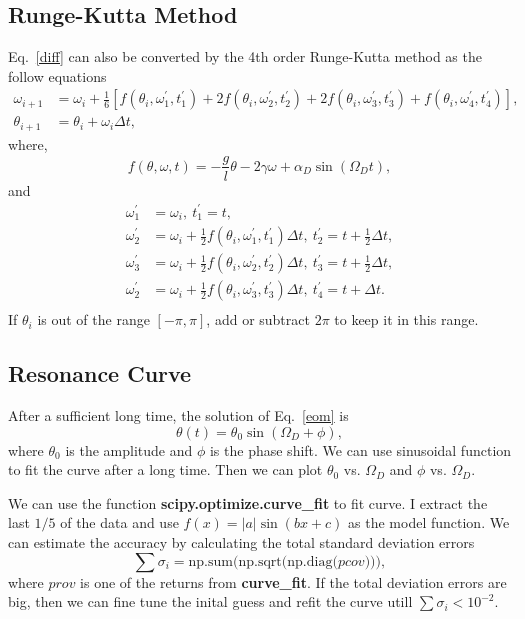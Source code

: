 \documentclass[a4paper]{article}
\begin{document}
	\subsection{Runge-Kutta Method}
	Eq.~\eqref{diff} can also be converted by the 4th order Runge-Kutta method as the follow equations
	\begin{align}
		\omega _{i+1} &= \omega _i + \frac{1}{6}[f(\theta _i, \omega _1^{\prime}, t_1^{\prime}) + 2f(\theta _i, \omega _2^{\prime}, t_2^{\prime}) + 2f(\theta _i, \omega _3^{\prime}, t_3^{\prime}) + f(\theta _i, \omega _4^{\prime}, t_4^{\prime})], \\
		\theta _{i+1} &= \theta _i + \omega _i \Delta t, \nonumber
	\end{align}
	where,
	\begin{equation*}
		f(\theta, \omega, t) = -\frac{g}{l}\theta - 2\gamma\omega + \alpha _D\sin(\Omega _D t),	
	\end{equation*}
	and
	\begin{align*}
		\omega _1^{\prime} &= \omega _i, \mathrm{~}t _1^{\prime} = t,\\
		\omega _2^{\prime} &= \omega _i + \frac{1}{2}f(\theta _i, \omega _1^{\prime}, t_1^{\prime})\Delta t , \mathrm{~}t _2^{\prime} = t + \frac{1}{2}\Delta t,\\
		\omega _3^{\prime} &= \omega _i + \frac{1}{2}f(\theta _i, \omega _2^{\prime}, t_2^{\prime})\Delta t , \mathrm{~}t _3^{\prime} = t + \frac{1}{2}\Delta t,\\
		\omega _2^{\prime} &= \omega _i + \frac{1}{2}f(\theta _i, \omega _3^{\prime}, t_3^{\prime})\Delta t , \mathrm{~}t _4^{\prime} = t + \Delta t.\\
	\end{align*}
	If $\theta _i$ is out of the range $[-\pi, \pi]$, add or subtract $2\pi$ to keep it in this range.
	\subsection{Resonance Curve}
	After a sufficient long time, the solution of Eq.~\eqref{eom} is
	\begin{equation}
		\theta(t) = \theta _0 \sin(\Omega _D + \phi),
	\end{equation}
	where $\theta _0$ is the amplitude and $\phi$ is the phase shift.
	We can use sinusoidal function to fit the curve after a long time. Then we can plot $\theta _0$ vs. $\Omega_D$ and $\phi$ vs. $\Omega _D$. 
	
	We can use the function \textbf{scipy.optimize.curve\_fit} to fit curve. I extract the last $1/5$ of the data and use $f(x) = |a|\sin(bx + c)$ as the model function. We can estimate the accuracy by calculating the total standard deviation errors
	\begin{equation}
		\sum\sigma _i = \mathrm{np.sum(np.sqrt(np.diag(}pcov\mathrm{)))},
	\end{equation}
	where $prov$ is one of the returns from \textbf{curve\_fit}.
	If the total deviation errors are big, then we can fine tune the inital guess and refit the curve utill $\sum\sigma _i < 10 ^{-2}$.
\end{document}
